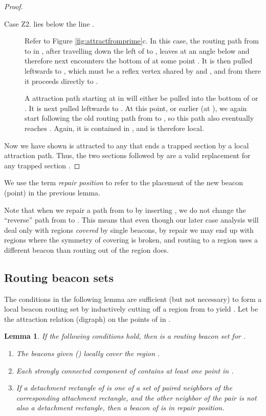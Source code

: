 \documentclass{article}
\newtheorem{lemma}{Lemma}
\begin{document}
\begin{proof}
\begin{description}
		\item[Case Z2.  lies below the line .]
			Refer to Figure \ref{fig:attractfromprime}c.
			In this case, the routing path from  to  in ,
			after travelling down the left of  to , leaves  at an angle
			below  and therefore next encounters the bottom of  at some point .
			It is then pulled leftwards to , which must be a reflex vertex shared by 
			and , and from there it proceeds directly to .
			
			A attraction path starting at  in  will either be pulled into
			the bottom of  or .  It is next pulled leftwards to .  At this
			point, or earlier (at ), we again start following the old routing path from  to , so this
			path also eventually reaches .  Again, it is contained in  , and is therefore local.
		\end{description}
		
		Now we have shown  is attracted to any  that ends a
		trapped section by a local attraction path.  Thus, the two sections
		 followed by  are a valid replacement for any trapped
		section .
	\end{proof} 

	We use the term \emph{repair position} to refer to the placement of the new
	beacon (point) in the previous lemma.
	
	Note that when we repair a path from  to  by inserting ,
	we do not change the ``reverse'' path from  to .
	This means that even though our later case analysis will deal only with
	regions \emph{covered} by single beacons, by repair we may end up with regions
	where the symmetry of covering is broken, and routing to a region uses a
	different beacon than routing out of the region does.



\subsection{Routing beacon sets}\label{sec:routingset}
	
	The conditions in the following lemma are sufficient (but not
	necessary) to form a local beacon routing set by inductively cutting off
	a region  from  to yield .  Let  be the
	attraction relation (digraph) on the points of  in .

	\begin{lemma}\label{lem:routingset}
		If the following conditions hold, then  is a
		routing beacon set for .
		\begin{enumerate}
		  	\item The beacons given () locally cover the region .
		  	\item Each strongly connected component of  contains at least
		  		one point in .
		  	\item If a detachment rectangle of  is one of a set of paired
		  	    neighbors of the corresponding attachment rectangle, and the other
		  	    neighbor of the pair is not also a detachment rectangle, then a beacon
		  	    of  is in repair position.
		\end{enumerate}
	\end{lemma}
	
\end{document}

